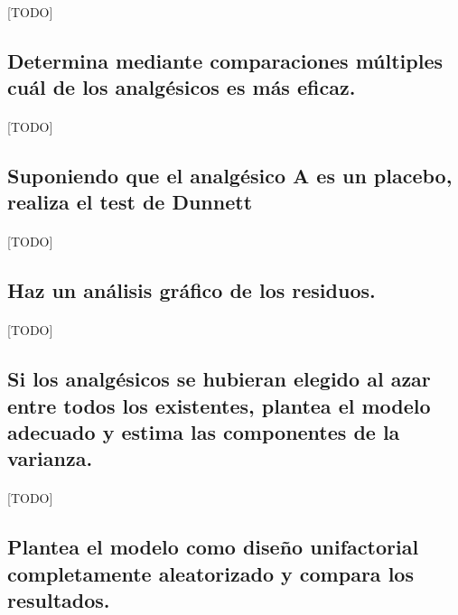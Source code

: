 \documentclass[11pt]{article}
\begin{document}
      \paragraph{}
      [TODO]

    \subsection{Determina mediante comparaciones múltiples cuál de los analgésicos es más eficaz.}

      \paragraph{}
      [TODO]

    \subsection{Suponiendo que el analgésico A es un placebo, realiza el test de Dunnett}

      \paragraph{}
      [TODO]

    \subsection{Haz un análisis gráfico de los residuos.}

      \paragraph{}
      [TODO]

    \subsection{Si los analgésicos se hubieran elegido al azar entre todos los existentes, plantea el modelo adecuado y estima las componentes de la varianza.}

      \paragraph{}
      [TODO]


    \subsection{Plantea el modelo como diseño unifactorial completamente aleatorizado y compara los resultados.}
\end{document}
